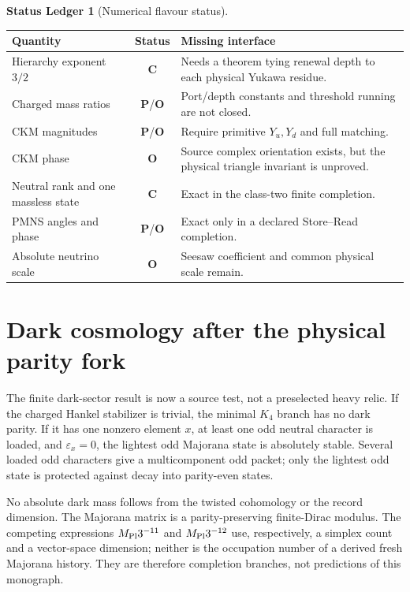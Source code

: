 \documentclass[11pt,oneside,openany]{book}
\numberwithin{equation}{chapter}
\theoremstyle{definition}
\newtheorem{ledger}[theorem]{Status Ledger}
\theoremstyle{remark}
\newcommand{\statusC}{\textcolor{CondColor}{\textbf{C}}}
\newcommand{\statusP}{\textcolor{PostColor}{\textbf{P}}}
\newcommand{\statusO}{\textcolor{OpenColor}{\textbf{O}}}
\begin{document}
\begin{ledger}[Numerical flavour status]
\begin{center}
\begin{tabularx}{0.96\textwidth}{@{}p{}cX@{}}
\toprule
Quantity & Status & Missing interface\\
\midrule
Hierarchy exponent $3/2$ & \statusC & Needs a theorem tying renewal depth to each physical Yukawa residue.\\
Charged mass ratios & \statusP/\statusO & Port/depth constants and threshold running are not closed.\\
CKM magnitudes & \statusP/\statusO & Require primitive $Y_u,Y_d$ and full matching.\\
CKM phase & \statusO & Source complex orientation exists, but the physical triangle invariant is unproved.\\
Neutral rank and one massless state & \statusC & Exact in the class-two finite completion.\\
PMNS angles and phase & \statusP/\statusO & Exact only in a declared Store--Read completion.\\
Absolute neutrino scale & \statusO & Seesaw coefficient and common physical scale remain.\\
\bottomrule
\end{tabularx}
\end{center}
\end{ledger}

\chapter{Dark cosmology after the physical parity fork}
\label{ch:dark-cosmology}

The finite dark-sector result is now a source test, not a preselected heavy
relic.  If the charged Hankel stabilizer is trivial, the minimal \(K_4\)
branch has no dark parity.  If it has one nonzero element \(x\), at least one
odd neutral character is loaded, and \(\varepsilon_x=0\), the lightest odd
Majorana state is absolutely stable.  Several loaded odd characters give a
multicomponent odd packet; only the lightest odd state is protected against
decay into parity-even states.

No absolute dark mass follows from the twisted cohomology or the record
dimension.  The Majorana matrix is a parity-preserving finite-Dirac modulus.
The competing expressions \(M_{\rm Pl}3^{-11}\) and
\(M_{\rm Pl}3^{-12}\) use, respectively, a simplex count and a vector-space
dimension; neither is the occupation number of a derived fresh Majorana
history.  They are therefore completion branches, not predictions of this
monograph.
\end{document}
